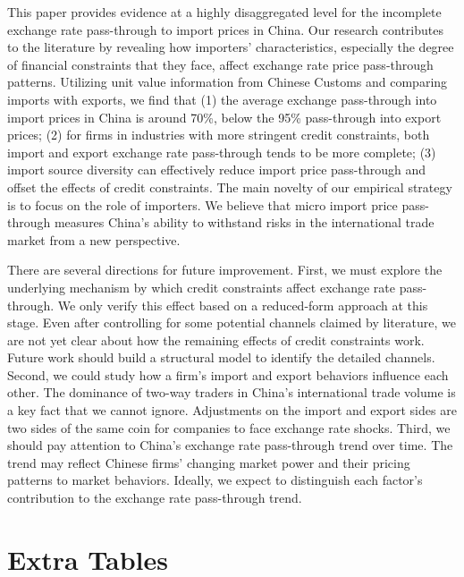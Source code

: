 This paper provides evidence at a highly disaggregated level for the incomplete exchange rate pass-through to import prices in China. Our research contributes to the literature by revealing how importers' characteristics, especially the degree of financial constraints that they face, affect exchange rate price pass-through patterns. Utilizing unit value information from Chinese Customs and comparing imports with exports, we find that (1) the average exchange pass-through into import prices in China is around 70\%, below the 95\% pass-through into export prices; (2) for firms in industries with more stringent credit constraints, both import and export exchange rate pass-through tends to be more complete; (3) import source diversity can effectively reduce import price pass-through and offset the effects of credit constraints. The main novelty of our empirical strategy is to focus on the role of importers. We believe that micro import price pass-through measures China's ability to withstand risks in the international trade market from a new perspective.

There are several directions for future improvement. First, we must explore the underlying mechanism by which credit constraints affect exchange rate pass-through. We only verify this effect based on a reduced-form approach at this stage. Even after controlling for some potential channels claimed by literature, we are not yet clear about how the remaining effects of credit constraints work. Future work should build a structural model to identify the detailed channels. Second, we could study how a firm's import and export behaviors influence each other. The dominance of two-way traders in China's international trade volume is a key fact that we cannot ignore. Adjustments on the import and export sides are two sides of the same coin for companies to face exchange rate shocks. Third, we should pay attention to China's exchange rate pass-through trend over time. The trend may reflect Chinese firms' changing market power and their pricing patterns to market behaviors. Ideally, we expect to distinguish each factor's contribution to the exchange rate pass-through trend. 

\newpage 


\appendix

\newpage

\section{Extra Tables}\label{Appendix-Tables}

